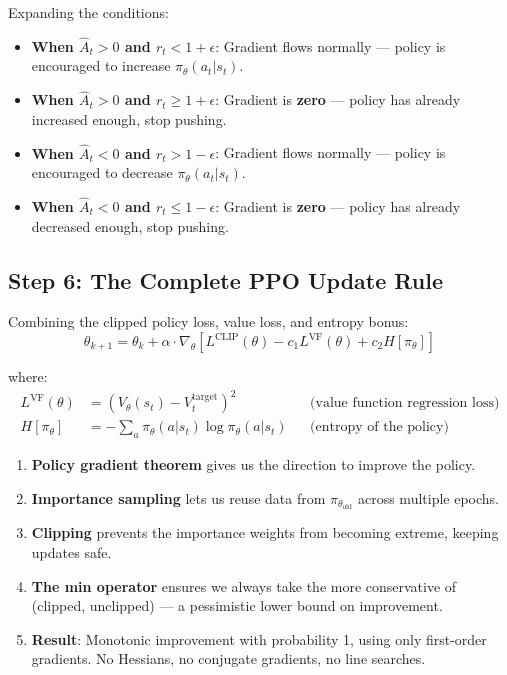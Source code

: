 Expanding the conditions:

\begin{itemize}
  \item \textbf{When $\hat{A}_t > 0$ and $r_t < 1+\epsilon$}: Gradient flows normally --- policy is encouraged to increase $\pi_\theta(a_t|s_t)$.
  \item \textbf{When $\hat{A}_t > 0$ and $r_t \geq 1+\epsilon$}: Gradient is \textbf{zero} --- policy has already increased enough, stop pushing.
  \item \textbf{When $\hat{A}_t < 0$ and $r_t > 1-\epsilon$}: Gradient flows normally --- policy is encouraged to decrease $\pi_\theta(a_t|s_t)$.
  \item \textbf{When $\hat{A}_t < 0$ and $r_t \leq 1-\epsilon$}: Gradient is \textbf{zero} --- policy has already decreased enough, stop pushing.
\end{itemize}

\subsection{Step 6: The Complete PPO Update Rule}
\label{step-6-the-complete-ppo-update-rule}

Combining the clipped policy loss, value loss, and entropy bonus: 
\begin{equation}
\boxed{\theta_{k+1} = \theta_k + \alpha \cdot \nabla_\theta \left[L^{\text{CLIP}}(\theta) - c_1 L^{\text{VF}}(\theta) + c_2 H[\pi_\theta]\right]}
\end{equation}

where: 
\begin{align}
L^{\text{VF}}(\theta) &= \left(V_\theta(s_t) - V_t^{\text{target}}\right)^2 & &\text{(value function regression loss)} \\
H[\pi_\theta] &= -\sum_a \pi_\theta(a|s_t)\log\pi_\theta(a|s_t) & &\text{(entropy of the policy)}
\end{align}

\begin{intuitionbox}
\begin{enumerate}
  \item \textbf{Policy gradient theorem} gives us the direction to improve the policy.
  \item \textbf{Importance sampling} lets us reuse data from $\pi_{\theta_{\text{old}}}$ across multiple epochs.
  \item \textbf{Clipping} prevents the importance weights from becoming extreme, keeping updates safe.
  \item \textbf{The min operator} ensures we always take the more conservative of (clipped, unclipped) --- a pessimistic lower bound on improvement.
  \item \textbf{Result}: Monotonic improvement with probability 1, using only first-order gradients. No Hessians, no conjugate gradients, no line searches.
\end{enumerate}
\end{intuitionbox}

